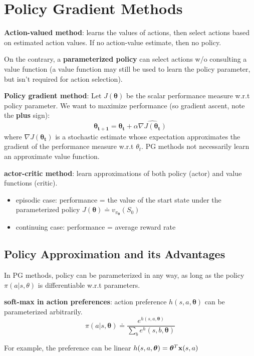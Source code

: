 \documentclass[sutton_barto_notes.tex]{subfiles}
\begin{document}
\newpage
\section{Policy Gradient Methods}

\textbf{Action-valued method}: learns the values of actions, then select actions based on estimated action values. If no action-value estimate, then no policy.

On the contrary, a \textbf{parameterized policy} can select actions w/o consulting a value function (a value function may still be used to learn the policy parameter, but isn't required for action selection).

\textbf{Policy gradient method}:
Let $J(\bm{\theta})$ be the scalar performance measure w.r.t policy parameter. We want to maximize performance (so gradient ascent, note the \textbf{plus} sign):
$$ \bm{\theta_{t+1}} = \bm{\theta_t} + \alpha \widehat{\nabla J(\bm{\theta_t})}$$
where $\widehat{\nabla J(\bm{\theta_t})}$ is a stochastic estimate whose expectation approximates the gradient of the performance measure w.r.t $\theta_t$. PG methods not necessarily learn an approximate value function.

\textbf{actor-critic method}: learn approximations of both policy (actor) and value functions (critic).

\begin{itemize}
\item episodic case: performance = the value of the start state under the parameterized policy $J(\bm{\theta}) \doteq v_{\pi_{\bm{\theta}}}(S_0)$
\item continuing case: performance = average reward rate
\end{itemize}

\subsection{Policy Approximation and its Advantages}

In PG methods, policy can be parameterized in any way, as long as the policy $\pi(a|s,\theta)$ is differentiable w.r.t parameters.

\begin{definition}
\textbf{soft-max in action preferences}: action preference $h(s,a,\bm{\theta})$ can be parameterized arbitrarily.
$$ \pi(a|s,\bm{\theta}) \doteq \frac{e^{h(s,a,\bm{\theta})}}{\sum_b e^h(s,b,\bm{\theta})}$$
\end{definition}
For example, the preference can be linear $h(s,a,\bm{\theta}) = \bm{\theta}^T {\operatorname*{\mathbf{x}}}(s,a)$
\end{document}
